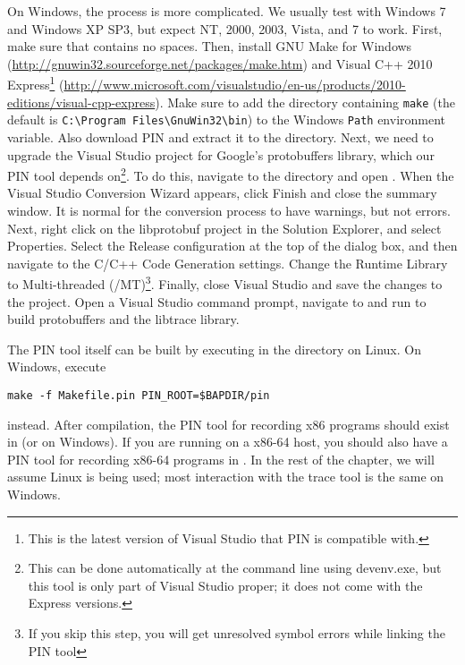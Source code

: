 On Windows, the process is more complicated.  We usually test with
Windows 7 and Windows XP SP3, but expect NT, 2000, 2003, Vista, and 7
to work.  First, make sure that  contains no
spaces. Then, install GNU Make for Windows
(\url{http://gnuwin32.sourceforge.net/packages/make.htm}) and Visual
C++ 2010 Express\footnote{This is the latest version of Visual Studio
  that PIN is compatible with.}
(\url{http://www.microsoft.com/visualstudio/en-us/products/2010-editions/visual-cpp-express}).
Make sure to add the directory containing \texttt{make} (the default
is \verb!C:\Program Files\GnuWin32\bin!) to the Windows \texttt{Path}
environment variable.  Also download PIN and extract it to the
 directory.  Next, we need to upgrade the Visual
Studio project for Google's protobuffers library, which our PIN tool
depends on\footnote{This can be done automatically at the command line
  using devenv.exe, but this tool is only part of Visual Studio
  proper; it does not come with the Express versions.}.  To do this,
navigate to the
 directory
and open .  When the Visual Studio Conversion
Wizard appears, click Finish and close the summary window.  It is
normal for the conversion process to have warnings, but not errors.
Next, right click on the libprotobuf project in the Solution Explorer,
and select Properties.  Select the Release configuration at the top of
the dialog box, and then navigate to the C/C++ Code Generation
settings.  Change the Runtime Library to Multi-threaded
(/MT)\footnote{If you skip this step, you will get unresolved symbol
  errors while linking the PIN tool}.  Finally, close Visual Studio
and save the changes to the project.  Open a Visual Studio command
prompt, navigate to 
and run  to build protobuffers and
the libtrace library.

The PIN tool itself can be built by executing  in the
 directory on Linux.  On Windows, execute
\begin{verbatim}
make -f Makefile.pin PIN_ROOT=$BAPDIR/pin
\end{verbatim}
instead. After compilation, the PIN tool for recording x86 programs
should exist in  (or
 on Windows).  If you are running on a x86-64
host, you should also have a PIN tool for recording x86-64 programs in
.  In the rest of
the chapter, we will assume Linux is being used; most interaction with
the trace tool is the same on Windows.

